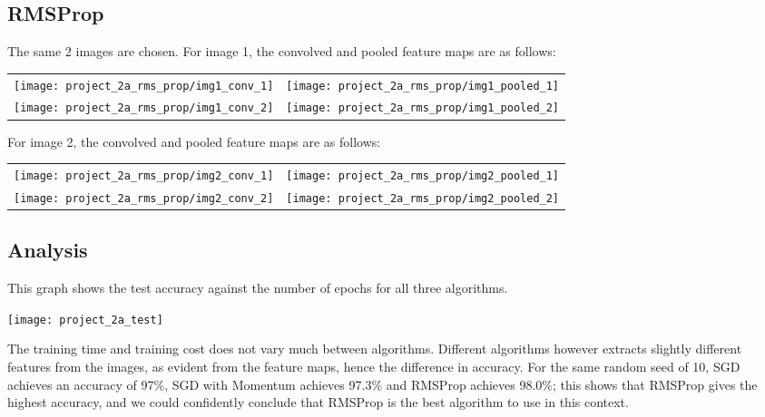 \subsection*{RMSProp}

The same 2 images are chosen.
For image 1, the convolved and pooled feature maps are as follows:

\begin{longtabu}{X[c]X[c]}
    \texttt{[image: project\_2a\_rms\_prop/img1\_conv\_1]} &
    \texttt{[image: project\_2a\_rms\_prop/img1\_pooled\_1]} \\
    \texttt{[image: project\_2a\_rms\_prop/img1\_conv\_2]} &
    \texttt{[image: project\_2a\_rms\_prop/img1\_pooled\_2]}
\end{longtabu}

For image 2, the convolved and pooled feature maps are as follows:

\begin{longtabu}{X[c]X[c]}
    \texttt{[image: project\_2a\_rms\_prop/img2\_conv\_1]} &
    \texttt{[image: project\_2a\_rms\_prop/img2\_pooled\_1]} \\
    \texttt{[image: project\_2a\_rms\_prop/img2\_conv\_2]} &
    \texttt{[image: project\_2a\_rms\_prop/img2\_pooled\_2]}
\end{longtabu}

\subsection*{Analysis}

This graph shows the test accuracy against the number of epochs for
all three algorithms.

\begin{center}
    \texttt{[image: project\_2a\_test]}
\end{center}

The training time and training cost does not vary much between algorithms.
Different algorithms however extracts slightly different features from the
images, as evident from the feature maps, hence the difference in accuracy.
For the same random seed of 10, SGD achieves an accuracy of 97\%, SGD with
Momentum achieves 97.3\% and RMSProp achieves 98.0\%; this shows that
RMSProp gives the highest accuracy, and we could confidently conclude that
RMSProp is the best algorithm to use in this context.
